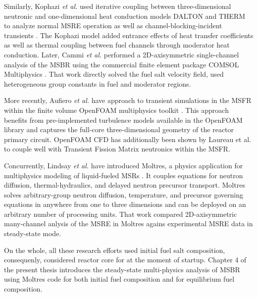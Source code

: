 Similarly, Kophazi \emph{et al.} used iterative coupling between three-dimensional neutronic and one-dimensional heat conduction models DALTON and THERM to analyze normal \gls{MSRE} operation as well as channel-blocking-incident transients \cite{kophazi_development_2009}. The Kophazi model added entrance effects of heat transfer coefficients as well as thermal coupling between fuel channels through moderator heat conduction. Later, Cammi \emph{et al.} performed a 2D-axisymmetric single-channel analysis of the \gls{MSBR} using the commercial finite element package COMSOL Multiphysics \cite{cammi_multi-physics_2011}. That work directly solved the fuel salt velocity field, used heterogeneous group constants in fuel and moderator regions.  

More recently, Aufiero \emph{et al.} \cite{aufiero_development_2014} have approach to transient simulations in the \gls{MSFR} within the finite volume
OpenFOAM multiphysics toolkit \cite{weller_tensorial_1998}.  This approach
benefits from pre-implemented turbulence models available in the OpenFOAM
library and captures the full-core three-dimensional geometry of the reactor
primary circuit.  OpenFOAM \gls{CFD} has additionally been shown by Laureau et
al. \cite{laureau_transient_2017} to couple well with Transient Fission Matrix
neutronics within the \gls{MSFR}.

Concurrently, Lindsay \emph{et al.} have introduced Moltres, a physics application for multiphysics modeling of liquid-fueled \glspl{MSR} \cite{lindsay_introduction_2018}. It couples equations for neutron diffusion, thermal-hydraulics, and delayed neutron precursor transport. Moltres solves arbitrary-group neutron diffusion, temperature, and precursor governing equations in anywhere from one to three dimensions and can be deployed on an arbitrary number of processing units. That work compared 2D-axisymmetric many-channel anlysis of the \gls{MSRE} in Moltres agains experimental \gls{MSRE} data in steady-state mode.

On the whole, all these research efforts used initial fuel salt composition, consequenly, considered reactor core for at the moment of startup. Chapter 4 of the present thesis introduces the steady-state multi-physics analysis of \gls{MSBR} using Moltres code for both initial fuel composition and for equilibrium fuel composition.

